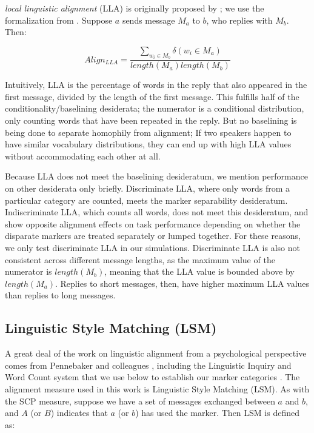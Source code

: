 \documentclass{acm_proc_article-sp}
\begin{document}
\textit{local linguistic alignment} (LLA) is originally proposed by \cite{FusaroliEtAl2012}; we use the formalization from \cite{WangReitterYen2014}.  Suppose $a$ sends message $M_a$ to $b$, who replies with $M_b$. Then:

\begin{equation}
Align_{LLA} = \frac{\sum_{w_i \in M_b} \delta(w_i \in M_a)}{length(M_a)length(M_b)}
\end{equation}

Intuitively, LLA is the percentage of words in the reply that also appeared in the first message, divided by the length of the first message.  This fulfills half of the conditionality/baselining desiderata; the numerator is a conditional distribution, only counting words that have been repeated in the reply.  But no baselining is being done to separate homophily from alignment; If two speakers happen to have similar vocabulary distributions, they can end up with high LLA values without accommodating each other at all.

Because LLA does not meet the baselining desideratum, we mention performance on other desiderata only briefly. Discriminate LLA, where only words from a particular category are counted, meets the marker separability desideratum.  Indiscriminate LLA, which counts all words, does not meet this desideratum, and \cite{FusaroliEtAl2012} show opposite alignment effects on task performance depending on whether the disparate markers are treated separately or lumped together.  For these reasons, we only test discriminate LLA in our simulations. Discriminate LLA is also not consistent across different message lengths, as the maximum value of the numerator is $length(M_b)$, meaning that the LLA value is bounded above by $length(M_a)$. Replies to short messages, then, have higher maximum LLA values than replies to long messages.



\subsection{Linguistic Style Matching (LSM)} 

A great deal of the work on linguistic alignment from a psychological perspective comes from Pennebaker and colleagues \cite{NiederhofferPennebaker2002,GonzalesHancockPennebaker2010,IrelandEtAl2011}, including the Linguistic Inquiry and Word Count system that we use below to establish our marker categories \cite{LIWC}.  The alignment measure used in this work is Linguistic Style Matching (LSM). As with the SCP measure, suppose we have a set of messages exchanged between $a$ and $b$, and $A$ (or $B$) indicates that $a$ (or $b$) has used the marker. Then LSM is defined as:
\end{document}
